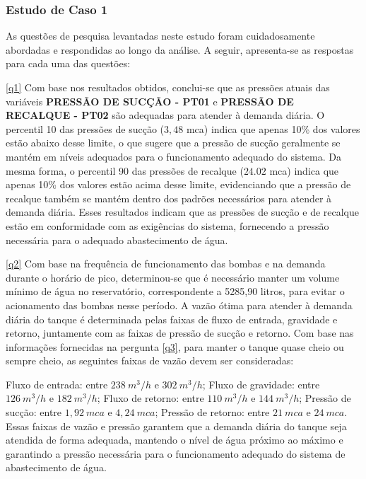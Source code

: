 \subsubsection{Estudo de Caso 1}\label{subsubsec:quest-est}


As questões de pesquisa levantadas neste estudo foram cuidadosamente abordadas e respondidas ao longo da análise. A seguir, apresenta-se as respostas para cada uma das questões:

\ref{q1} Com base nos resultados obtidos, conclui-se que as pressões atuais das variáveis \textbf{PRESSÃO DE SUCÇÃO - PT01} e \textbf{PRESSÃO DE RECALQUE - PT02} são adequadas para atender à demanda diária. O percentil 10 das pressões de sucção ($3,48$ mca) indica que apenas 10\% dos valores estão abaixo desse limite, o que sugere que a pressão de sucção geralmente se mantém em níveis adequados para o funcionamento adequado do sistema. Da mesma forma, o percentil 90 das pressões de recalque ($24.02$ mca) indica que apenas 10\% dos valores estão acima desse limite, evidenciando que a pressão de recalque também se mantém dentro dos padrões necessários para atender à demanda diária.
Esses resultados indicam que as pressões de sucção e de recalque estão em conformidade com as exigências do sistema, fornecendo a pressão necessária para o adequado abastecimento de água.

\ref{q2} Com base na frequência de funcionamento das bombas e na demanda durante o horário de pico, determinou-se que é necessário manter um volume mínimo de água no reservatório, correspondente a 5285,90 litros, para evitar o acionamento das bombas nesse período.
A vazão ótima para atender à demanda diária do tanque é determinada pelas faixas de fluxo de entrada, gravidade e retorno, juntamente com as faixas de pressão de sucção e retorno. Com base nas informações fornecidas na pergunta \ref{q3}, para manter o tanque quase cheio ou sempre cheio, as seguintes faixas de vazão devem ser consideradas:

Fluxo de entrada: entre $238 \ m^3/h$ e $302 \ m^3/h$;
Fluxo de gravidade: entre $126 \ m^3/h$ e $182 \ m^3/h$;
Fluxo de retorno: entre $110 \ m^3/h$ e $144 \ m^3/h$;
Pressão de sucção: entre $1,92 \ mca$ e $4,24 \ mca$;
Pressão de retorno: entre $21 \ mca$ e $24 \ mca$.
Essas faixas de vazão e pressão garantem que a demanda diária do tanque seja atendida de forma adequada, mantendo o nível de água próximo ao máximo e garantindo a pressão necessária para o funcionamento adequado do sistema de abastecimento de água.


